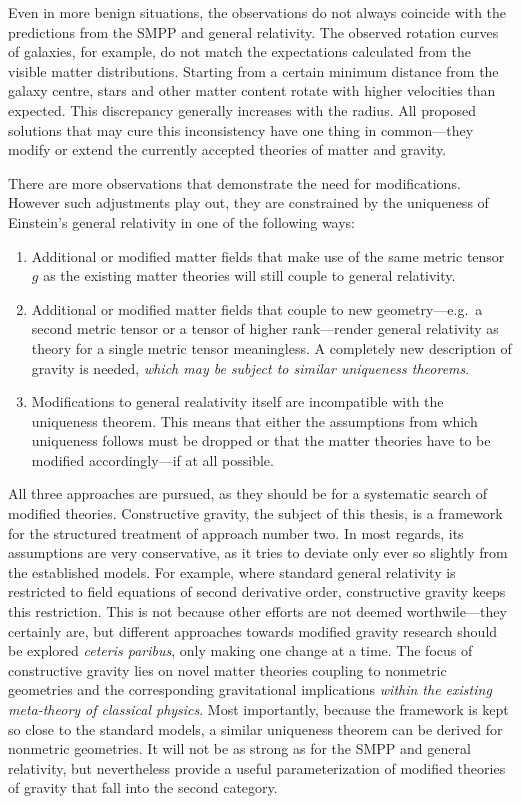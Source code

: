 Even in more benign situations, the observations do not always coincide with the predictions from the SMPP and general relativity. The observed rotation curves of galaxies, for example, do not match the expectations calculated from the visible matter distributions. Starting from a certain minimum distance from the galaxy centre, stars and other matter content rotate with higher velocities than expected. \cite{Freeman_1970,Rubin_1970,Rubin_1980} This discrepancy generally increases with the radius. All proposed solutions \cite{} that may cure this inconsistency have one thing in common---they modify or extend the currently accepted theories of matter and gravity.

There are more observations \cite{} that demonstrate the need for modifications. However such adjustments play out, they are constrained by the uniqueness of Einstein's general relativity in one of the following ways:
\begin{enumerate}
  \item Additional or modified matter fields that make use of the same metric tensor $g$ as the existing matter theories will still couple to general relativity.
  \item Additional or modified matter fields that couple to new geometry---e.g.\ a second metric tensor or a tensor of higher rank---render general relativity as theory for a single metric tensor meaningless. A completely new description of gravity is needed, \emph{which may be subject to similar uniqueness theorems}.
  \item Modifications to general realativity itself are incompatible with the uniqueness theorem. This means that either the assumptions from which uniqueness follows must be dropped or that the matter theories have to be modified accordingly---if at all possible.
\end{enumerate}
All three approaches are pursued, as they should be for a systematic search of modified theories. Constructive gravity, the subject of this thesis, is a framework for the structured treatment of approach number two. In most regards, its assumptions are very conservative, as it tries to deviate only ever so slightly from the established models. For example, where standard general relativity is restricted to field equations of second derivative order, constructive gravity keeps this restriction. This is not because other efforts are not deemed worthwile---they certainly are, but different approaches towards modified gravity research should be explored \emph{ceteris paribus}, only making one change at a time. The focus of constructive gravity lies on novel matter theories coupling to nonmetric geometries and the corresponding gravitational implications \emph{within the existing meta-theory of classical physics}. Most importantly, because the framework is kept so close to the standard models, a similar uniqueness theorem can be derived for nonmetric geometries. It will not be as strong as for the SMPP and general relativity, but nevertheless provide a useful parameterization of modified theories of gravity that fall into the second category.

